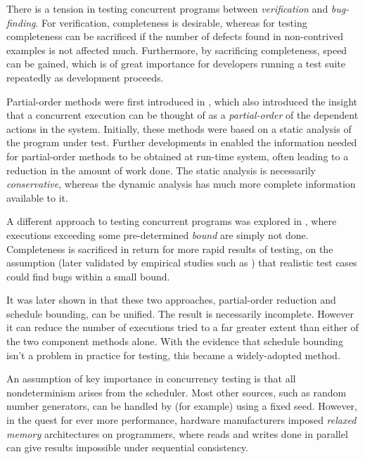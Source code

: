 
There is a tension in testing concurrent programs between
\emph{verification} and \emph{bug-finding}. For verification,
completeness is desirable, whereas for testing completeness can be
sacrificed if the number of defects found in non-contrived examples is
not affected much. Furthermore, by sacrificing completeness, speed can
be gained, which is of great importance for developers running a test
suite repeatedly as development proceeds.


Partial-order methods were first introduced in \citep{por}, which also
introduced the insight that a concurrent execution can be thought of
as a \emph{partial-order} of the dependent actions in the
system. Initially, these methods were based on a static analysis of
the program under test. Further developments in \citep{dpor} enabled
the information needed for partial-order methods to be obtained at
run-time system, often leading to a reduction in the amount of work
done. The static analysis is necessarily \emph{conservative}, whereas
the dynamic analysis has much more complete information available to
it.

A different approach to testing concurrent programs was explored in
\citep{pbound}, where executions exceeding some pre-determined
\emph{bound} are simply not done. Completeness is sacrificed in return
for more rapid results of testing, on the assumption (later validated
by empirical studies such as \citep{empirical}) that realistic test
cases could find bugs within a small bound.

It was later shown in \citep{bpor} that these two approaches,
partial-order reduction and schedule bounding, can be unified. The
result is necessarily incomplete. However it can reduce the number of
executions tried to a far greater extent than either of the two
component methods alone. With the evidence that schedule bounding
isn't a problem in practice for testing, this became a widely-adopted
method.

An assumption of key importance in concurrency testing is that all
nondeterminism arises from the scheduler. Most other sources, such as
random number generators, can be handled by (for example) using a
fixed seed. However, in the quest for ever more performance, hardware
manufacturers imposed \emph{relaxed memory} architectures on
programmers, where reads and writes done in parallel can give results
impossible under sequential consistency.

